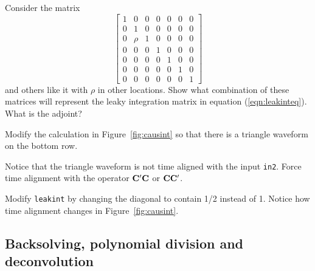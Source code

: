 \begin{exer}

\item
Consider the matrix
\begin{equation}
  \left[
        \begin{array}{cccccccc}
             1 &     0 &     0 &     0 &     0 &     0 &     0 \\
             0 &     1 &     0 &     0 &     0 &     0 &     0 \\
             0 &  \rho &     1 &     0 &     0 &     0 &     0 \\
             0 &     0 &     0 &     1 &     0 &     0 &     0 \\
             0 &     0 &     0 &     0 &     1 &     0 &     0 \\
             0 &     0 &     0 &     0 &     0 &     1 &     0 \\
             0 &     0 &     0 &     0 &     0 &     0 &     1 
        \end{array}
  \right]
\end{equation}
and others like it with $\rho$ in other locations.
Show what combination of these matrices will represent
the leaky integration matrix
in equation (\ref{eqn:leakinteq}).  What is the adjoint?

\item
Modify the calculation in Figure~\ref{fig:causint} so that there is
a triangle waveform on the bottom row.
\item
Notice that the triangle waveform is not time aligned
with the input {\tt in2}.
Force time alignment with the operator 
${\bold C' \bold C}$ or
${\bold C  \bold C'}$.
\item
Modify \texttt{leakint}  by changing the diagonal to contain
1/2 instead of 1.
Notice how time alignment changes in Figure~\ref{fig:causint}.
\end{exer}




\subsection{Backsolving, polynomial division and deconvolution}

